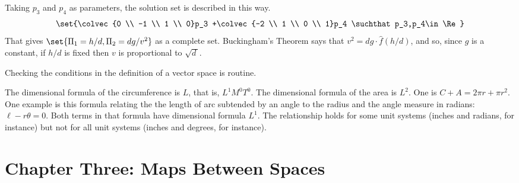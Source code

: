 \begin{ans}{4}
\begin{exparts}
              Taking $p_3$ and $p_4$ as parameters, the
              solution set is described in this way.
              \begin{equation*}
                \set{\colvec{0 \\ -1 \\ 1 \\ 0}p_3
                     +\colvec{-2 \\ 1 \\ 0 \\ 1}p_4
                     \suchthat p_3,p_4\in\Re}
              \end{equation*}
              That gives $\set{\Pi_1=h/d,\Pi_2=dg/v^2}$ as a complete set.
            \partsitem Buckingham's Theorem says that
              $v^2=dg\cdot\hat{f}(h/d)$, and so, since $g$ is a constant,
              if $h/d$ is fixed then $v$ is proportional to $\sqrt{d\,}$.
          \end{exparts}
        
\end{ans}
\begin{ans}{5}
        Checking the conditions in the definition of a vector space is
        routine.
      
\end{ans}
\begin{ans}{6}
      \begin{exparts}
        \partsitem The dimensional formula of the circumference is $L$,
          that is, $L^1M^0T^0$.
          The dimensional formula of the area is $L^2$.
        \partsitem One is $C+A=2\pi r + \pi r^2$.
        \partsitem One example is this formula relating the
           the length of arc subtended by an angle to the radius and the
           angle measure in radians:~$\ell-r\theta=0$.
           Both terms in that formula have dimensional
           formula $L^1$.
           The relationship holds for some
           unit systems (inches and radians, for instance) but not for all
           unit systems (inches and degrees, for instance).
      \end{exparts}
    
\end{ans}
\chapter{Chapter Three: Maps Between Spaces}

